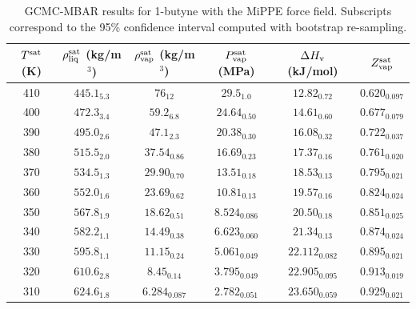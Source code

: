 \documentclass[journal=jctc,manuscript=article]{achemso}
\begin{document}
\begin{table}[htb!]
	\caption{GCMC-MBAR results for 1-butyne with the MiPPE force field. Subscripts correspond to the 95\% confidence interval computed with bootstrap re-sampling.}
	\begin{center}
		\begin{tabular}{|c|c|c|c|c|c|}
			\hline
			$T^{\rm sat}$ (K) & $\rho_{\rm liq}^{\rm sat}$ (kg/m$^3$) & $\rho_{\rm vap}^{\rm sat}$ (kg/m$^3$) & $P_{\rm vap}^{\rm sat}$ (MPa) & $\Delta H_{\rm v}$ (kJ/mol) & $Z_{\rm vap}^{\rm sat}$ \\ \hline
			410 & $445.1_{5.3}$ & $76_{12}$ & $29.5_{1.0}$ & $12.82_{0.72}$ & $0.620_{0.097}$ \\
			400 & $472.3_{3.4}$ & $59.2_{6.8}$ & $24.64_{0.50}$ & $14.61_{0.60}$ & $0.677_{0.079}$ \\
			390 & $495.0_{2.6}$ & $47.1_{2.3}$ & $20.38_{0.30}$ & $16.08_{0.32}$ & $0.722_{0.037}$ \\
			380 & $515.5_{2.0}$ & $37.54_{0.86}$ & $16.69_{0.23}$ & $17.37_{0.16}$ & $0.761_{0.020}$ \\
			370 & $534.5_{1.3}$ & $29.90_{0.70}$ & $13.51_{0.18}$ & $18.53_{0.13}$ & $0.795_{0.021}$ \\
			360 & $552.0_{1.6}$ & $23.69_{0.62}$ & $10.81_{0.13}$ & $19.57_{0.16}$ & $0.824_{0.024}$ \\
			350 & $567.8_{1.9}$ & $18.62_{0.51}$ & $8.524_{0.086}$ & $20.50_{0.18}$ & $0.851_{0.025}$ \\
			340 & $582.2_{1.1}$ & $14.49_{0.38}$ & $6.623_{0.060}$ & $21.34_{0.13}$ & $0.874_{0.024}$ \\
			330 & $595.8_{1.1}$ & $11.15_{0.24}$ & $5.061_{0.049}$ & $22.112_{0.082}$ & $0.895_{0.021}$ \\
			320 & $610.6_{2.8}$ & $8.45_{0.14}$ & $3.795_{0.049}$ & $22.905_{0.095}$ & $0.913_{0.019}$ \\
			310 & $624.6_{1.8}$ & $6.284_{0.087}$ & $2.782_{0.051}$ & $23.650_{0.059}$ & $0.929_{0.021}$ \\
			\hline
		\end{tabular}
	\end{center}
\end{table}
\end{document}
